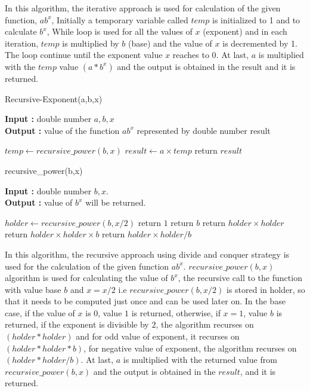 \documentclass[12pt, a4paper]{article}
\begin{document}
In this algorithm, the iterative approach is used for calculation of the given function, $ab^x$, Initially a temporary  variable called $temp$ is initialized to 1 and to calculate $b^x$, While loop is used for all the values of $x$ (exponent) and in each iteration, $temp$ is multiplied by $b$ (base) and the value of $x$ is decremented by 1. The loop continue until the exponent value $x$ reaches to 0. At last, $a$ is multiplied with the $temp$ value $(a*b^x)$ and the output is obtained in the result and it is returned.

\newpage

\begin{algorithm}[hbt!]
\caption{Recursive-Exponent(a,b,x)}\label{alg:two}

\hspace*{\algorithmicindent} \textbf{Input : }double number $a,b,x$ \\
\hspace*{\algorithmicindent} \textbf{Output : }value of the function $ab^x$ represented by double number result
\begin{algorithmic}[1]
\STATE $temp \gets recursive\_power(b,x)$
\STATE $result \gets a \times temp$
\STATE return $result$
\end{algorithmic}
\end{algorithm}



\begin{algorithm}[hbt!]
\caption{recursive\_power(b,x)}\label{alg:two}

\hspace*{\algorithmicindent} \textbf{Input : }double number $b,x$. \\
\hspace*{\algorithmicindent} \textbf{Output : }value of $b^x$ will be returned.
\begin{algorithmic}[1]
\STATE $holder \gets recursive\_power(b,x/2)$
  \STATE return $1$
  \STATE return $b$
  \STATE return $holder \times holder$
  \STATE return $holder \times holder \times b$
\ELSE
  \STATE return $holder \times holder {/} b$
\ENDIF
\end{algorithmic}
\end{algorithm}

In this algorithm, the recursive approach using divide and conquer strategy is used for the calculation of the given function $ab^x$. $recursive\_power(b,x)$ algorithm is used for calculating the value of $b^x$, the recursive call to the function with value base $b$ and $x = x/2$ i.e $recursive\_power(b,x/2)$ is stored in holder, so that it needs to be computed just once and can be used later on. In the base case, if the value of $x$ is 0, value $1$ is returned, otherwise, if $x=1$, value $b$ is returned, if the exponent is divisible by $2$, the algorithm recurses on $(holder * holder)$ and for odd value of exponent, it recurses on $(holder * holder * b)$, for negative value of exponent, the algorithm recurses on $(holder * holder / b)$. At last, $a$ is multiplied with the returned value from $recursive\_power(b,x)$ and the output is obtained in the $result$, and it is returned.
\end{document}
